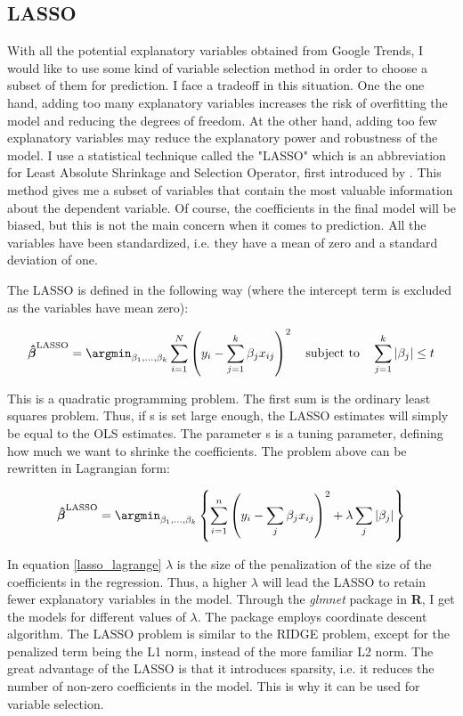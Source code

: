 \subsection{LASSO}

With all the potential explanatory variables obtained from Google Trends, I would like to use some kind of variable selection method in order to choose a subset of them for prediction. I face a tradeoff in this situation. One the one hand, adding too many explanatory variables increases the risk of overfitting the model and reducing the degrees of freedom. At the other hand, adding too few explanatory variables may reduce the explanatory power and robustness of the model. I use a statistical technique called the "LASSO" which is an abbreviation for Least Absolute Shrinkage and Selection Operator, first introduced by \cite{tibshirani1996}. This method gives me a subset of variables that contain the most valuable information about the dependent variable. Of course, the coefficients in the final model will be biased, but this is not the main concern when it comes to prediction. All the variables have been standardized, i.e. they have a mean of zero and a standard deviation of one.

The LASSO is defined in the following way (where the intercept term is excluded as the variables have mean zero):

\begin{equation}
 \boldsymbol{\hat{\beta}}^{\text{LASSO}} = \argmin_{\beta_1, \ldots, \beta_k} \sum_{i = 1}^N \left( y_i - \sum_{j = 1}^k \beta_j x_{ij} \right)^2 \quad\text{subject to} \quad \sum_{j = 1}^k  |\beta_j| \leq t
\end{equation}

This is a quadratic programming problem. The first sum is the ordinary least squares problem. Thus, if s is set large enough, the LASSO estimates will simply be equal to the OLS estimates. The parameter s is a tuning parameter, defining how much we want to shrinke the coefficients. The problem above can be rewritten in Lagrangian form:

\begin{equation}\label{lasso_lagrange}
\boldsymbol{\hat{\beta}}^{\text{LASSO}} = \argmin_{\beta_1, \ldots, \beta_k} \left\{\sum_{i = 1}^n \left( y_i - \sum_j \beta_j x_{ij} \right)^2 + \lambda \sum_{j}  |\beta_j|\right\}
\end{equation}

In equation \eqref{lasso_lagrange} $\lambda$ is the size of the penalization of the size of the coefficients in the regression. Thus, a higher $\lambda$ will lead the LASSO to retain fewer explanatory variables in the model. Through the \textit{glmnet} package in \textbf{R}, I get the models for different values of $\lambda$. The package employs coordinate descent algorithm. The LASSO problem is similar to the RIDGE problem, except for the penalized term being the L1 norm, instead of the more familiar L2 norm. The great advantage of the LASSO is that it introduces sparsity, i.e. it reduces the number of non-zero coefficients in the model. This is why it can be used for variable selection.

